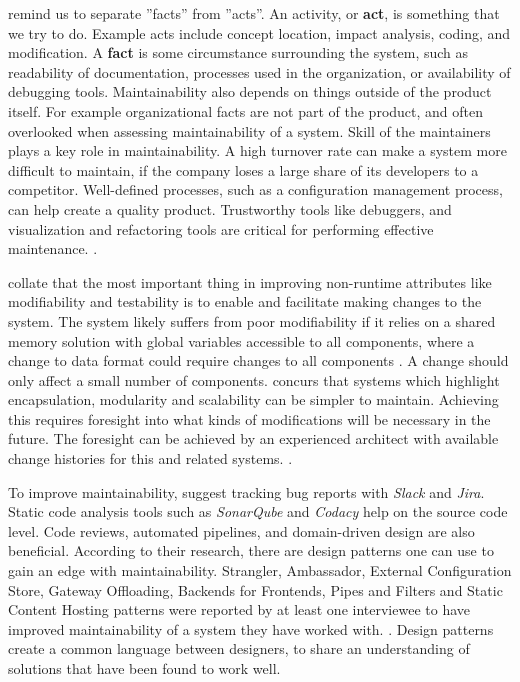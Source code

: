 \documentclass[utf8,english]{gradu3}
\begin{document}
\textcite{Broy2006} remind us to separate ''facts'' from ''acts''. An activity,
or \textbf{act}, is something that we try to do. Example acts include concept
location, impact analysis, coding, and modification. A \textbf{fact} is some
circumstance surrounding the system, such as readability of documentation,
processes used in the organization, or availability of debugging tools.
Maintainability also depends on things outside of the product itself.  For
example organizational facts are not part of the product, and often overlooked
when assessing maintainability of a system. Skill of the maintainers plays a key
role in maintainability. A high turnover rate can make a system more difficult
to maintain, if the company loses a large share of its developers to a
competitor. Well-defined processes, such as a configuration management process,
can help create a quality product.  Trustworthy tools like debuggers, and
visualization and refactoring tools are critical for performing effective
maintenance. \parencite[25-26]{Broy2006}.

\textcite{Bass1998} collate that the most important thing in improving
non-runtime attributes like modifiability and testability is to enable and
facilitate making changes to the system. The system likely suffers from poor
modifiability if it relies on a shared memory solution with global variables
accessible to all components, where a change to data format could require
changes to all components \parencite[89]{Bass1998}. A change should only affect
a small number of components. \textcite[96]{IEEE12207} concurs that systems
which highlight encapsulation, modularity and scalability can be simpler to
maintain. Achieving this requires foresight into what kinds of modifications
will be necessary in the future. The foresight can be achieved by an experienced
architect with available change histories for this and related systems.
\parencite[118]{Bass1998}.

To improve maintainability, \textcite[7]{Vale2022} suggest tracking bug reports
with \textit{Slack} and \textit{Jira}. Static code analysis tools such as
\textit{SonarQube} and \textit{Codacy} help on the source code level. Code
reviews, automated pipelines, and domain-driven design are also beneficial.
According to their research, there are design patterns one can use to gain an
edge with maintainability. Strangler, Ambassador, External Configuration Store,
Gateway Offloading, Backends for Frontends, Pipes and Filters and Static Content
Hosting patterns were reported by at least one interviewee to have improved
maintainability of a system they have worked with. \parencite[4-6]{Vale2022}.
Design patterns create a common language between designers, to share an
understanding of solutions that have been found to work well.
\end{document}
